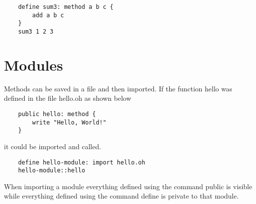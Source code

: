 \documentclass[12pt]{book}
\begin{document}
\begin{lstlisting}
	define sum3: method a b c {
		add a b c
	}
	sum3 1 2 3
\end{lstlisting}


\section{Modules}

Methods can be saved in a file and then imported. If the function hello
was defined in the file hello.oh as shown below

\begin{lstlisting}
	public hello: method {
		write "Hello, World!"
	}
\end{lstlisting}

it could be imported and called.

\begin{lstlisting}
	define hello-module: import hello.oh
	hello-module::hello
\end{lstlisting}

When importing a module everything defined using the command public
is visible while everything defined using the command define is
private to that module.
\end{document}
